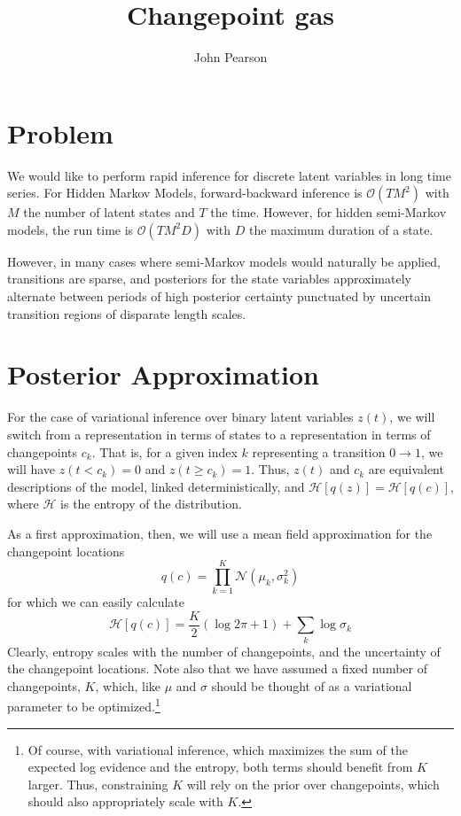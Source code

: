 \documentclass[11pt]{article}
\begin{document}
\title{Changepoint gas}
\author{John Pearson}
\maketitle

\section{Problem}
We would like to perform rapid inference for discrete latent variables in long time series. For Hidden Markov Models, forward-backward inference is $\mathcal{O}(TM^2)$ with $M$ the number of latent states and $T$ the time. However, for hidden semi-Markov models, the run time is $\mathcal{O}(TM^2 D)$ with $D$ the maximum duration of a state.

However, in many cases where semi-Markov models would naturally be applied, transitions are sparse, and posteriors for the state variables approximately alternate between periods of high posterior certainty punctuated by uncertain transition regions of disparate length scales.

\section{Posterior Approximation}
For the case of variational inference over binary latent variables $z(t)$, we will switch from a representation in terms of states to a representation in terms of changepoints $c_k$. That is, for a given index $k$ representing a transition $0 \rightarrow 1$, we will have $z(t < c_k) = 0$ and $z(t \ge c_k) = 1$. Thus, $z(t)$ and $c_k$ are equivalent descriptions of the model, linked deterministically, and $\mathcal{H}[q(z)] = \mathcal{H}[q(c)]$, where $\mathcal{H}$ is the entropy of the distribution.

As a first approximation, then, we will use a mean field approximation for the changepoint locations
\begin{equation}
\label{qc}
    q(c) = \prod_{k = 1}^K \mathcal{N}(\mu_k, \sigma^2_k)
\end{equation}
for which we can easily calculate
\begin{equation}
    \mathcal{H}[q(c)] = \frac{K}{2}(\log 2\pi + 1) + \sum_k \log \sigma_k
\end{equation}
Clearly, entropy scales with the number of changepoints, and the uncertainty of the changepoint locations. Note also that we have assumed a fixed number of changepoints, $K$, which, like $\mu$ and $\sigma$ should be thought of as a variational parameter to be optimized.\footnote{Of course, with variational inference, which maximizes the sum of the expected log evidence and the entropy, both terms should benefit from $K$ larger. Thus, constraining $K$ will rely on the prior over changepoints, which should also appropriately scale with $K$.}
\end{document}
